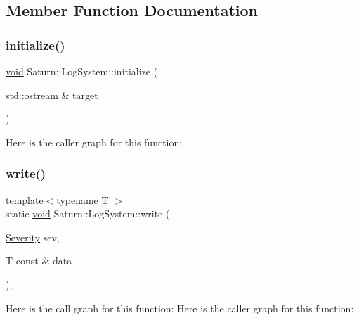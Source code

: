 \subsection{Member Function Documentation}
\mbox{\label{class_saturn_1_1_log_system_a9c1ccf4dfe4ab6803134267c8a2b969b}} 
\subsubsection{\texorpdfstring{initialize()}{initialize()}}
{\footnotesize\ttfamily \mbox{\hyperlink{glad_8h_a950fc91edb4504f62f1c577bf4727c29}{void}} Saturn\+::\+Log\+System\+::initialize (\begin{DoxyParamCaption}\item[{std\+::ostream \&}]{target }\end{DoxyParamCaption})\hspace{0.3cm}{\ttfamily [static]}}

Here is the caller graph for this function\+:
\mbox{\label{class_saturn_1_1_log_system_a81bd1711a0ed95e64bd345aa7681217e}} 
\subsubsection{\texorpdfstring{write()}{write()}}
{\footnotesize\ttfamily template$<$typename T $>$ \\
static \mbox{\hyperlink{glad_8h_a950fc91edb4504f62f1c577bf4727c29}{void}} Saturn\+::\+Log\+System\+::write (\begin{DoxyParamCaption}\item[{\mbox{\hyperlink{class_saturn_1_1_log_system_ab10c0f79f5466d3e47d56b857d09bdde}{Severity}}}]{sev,  }\item[{T const \&}]{data }\end{DoxyParamCaption})\hspace{0.3cm}{\ttfamily [inline]}, {\ttfamily [static]}}

Here is the call graph for this function\+:
Here is the caller graph for this function\+:
\mbox{\label{class_saturn_1_1_log_system_a477ee92097499a28744de407fb12c0dd}} 
